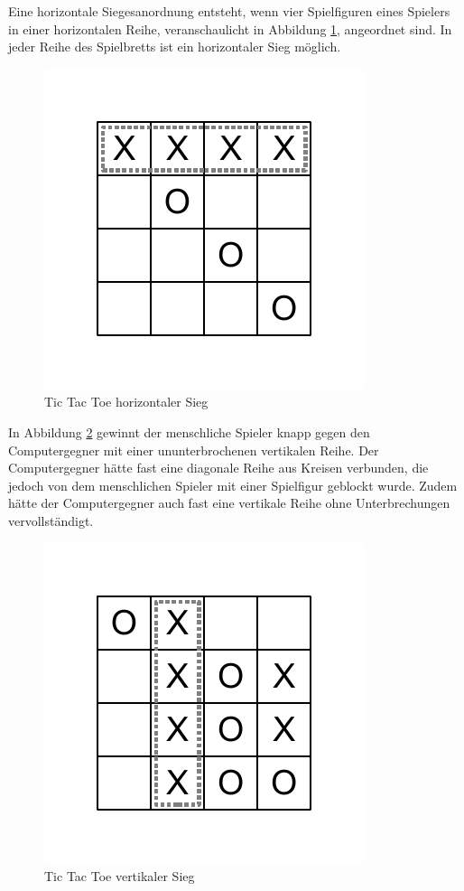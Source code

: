 Eine horizontale Siegesanordnung entsteht, wenn vier Spielfiguren eines Spielers in einer horizontalen Reihe, veranschaulicht in Abbildung \ref{fig:tttHorizontalerSieg}, angeordnet sind. In jeder Reihe des Spielbretts ist ein horizontaler Sieg möglich.

\begin{figure}[!htbp]
  \centering
  \includegraphics[scale = 1]{inhalt/abbildungen/horizontaler_sieg.pdf}
  \caption{Tic Tac Toe horizontaler Sieg}
  \label{fig:tttHorizontalerSieg}
\end{figure}

In Abbildung \ref{fig:tttVertikalerSieg} gewinnt der menschliche Spieler knapp gegen den Computergegner mit einer ununterbrochenen vertikalen Reihe. Der Computergegner hätte fast eine diagonale Reihe aus Kreisen verbunden, die jedoch von dem menschlichen Spieler mit einer Spielfigur geblockt wurde. Zudem hätte der Computergegner auch fast eine vertikale Reihe ohne Unterbrechungen vervollständigt.

\begin{figure}[!htbp]
  \centering
  \includegraphics[scale = 1]{inhalt/abbildungen/vertikaler_sieg.pdf}
  \caption{Tic Tac Toe vertikaler Sieg}
  \label{fig:tttVertikalerSieg}
\end{figure}

